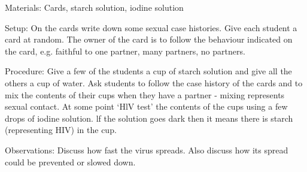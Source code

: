 \begin{multicols}{2}
\begin{description*}
\item[Materials:]{Cards, starch solution, iodine solution}
\item[Setup:]{On the cards write down some sexual case histories. Give each student
a card at random. The owner of the card is to follow the behaviour
indicated on the card, e.g. faithful to one partner, many partners, no
partners. }
\item[Procedure:]{Give a few of the students a cup of starch solution and give
all the others a cup of water. Ask students to follow the case history of
the cards and to mix the contents of their cups when they have a
partner - mixing represents sexual contact. At some point `HlV test' the
contents of the cups using a few drops of iodine solution. lf the
solution goes dark then it means there is starch (representing HIV) in
the cup.}
\item[Observations:]{Discuss how fast the virus
spreads. Also discuss how its
spread could be prevented or
slowed down.}
\end{description*}



\end{multicols}

\pagebreak